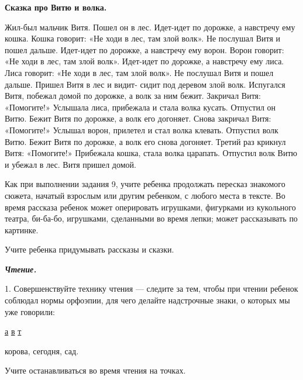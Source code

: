 \documentclass[a5paper]{book}
\renewcommand{\emph}[1]{\textit{#1}}
\begin{document}
\textbf{Сказка про Витю и волка.}

Жил-был мальчик Витя. Пошел он в лес. Идет-идет по дорожке, а навстречу
ему кошка. Кошка говорит: «Не ходи в лес, там злой волк». Не послушал
Витя и пошел дальше. Идет-идет по дорожке, а навстречу ему ворон. Ворон
говорит: «Не ходи в лес, там злой волк». Идет-идет по дорожке, а
навстречу ему лиса. Лиса говорит: «Не ходи в лес, там злой волк». Не
послушал Витя и пошел дальше. Пришел Витя в лес и видит- сидит под
деревом злой волк. Испугался Витя, побежал домой по дорожке, а волк за
ним бежит. Закричал Витя: «Помогите!» Услышала лиса, прибежала и стала
волка кусать. Отпустил он Витю. Бежит Витя по дорожке, а волк его
догоняет. Снова закричал Витя: «Помогите!» Услышал ворон, прилетел и
стал волка клевать. Отпустил волк Витю. Бежит Витя по дорожке, а волк
его снова догоняет. Третий раз крикнул Витя: «Помогите!» Прибежала
кошка, стала волка царапать. Отпустил волк Витю и убежал в лес. Витя
пришел домой.

Как при выполнении задания 9, учите ребенка продолжать пересказ
знакомого сюжета, начатый взрослым или другим ребенком, с любого места в
тексте. Во время рассказа ребенок может оперировать игрушками, фигурками
из кукольного театра, би-ба-бо, игрушками, сделанными во время лепки;
может рассказывать по картинке.

Учите ребенка придумывать рассказы и сказки.

\emph{\textbf{Чтение.}}

1. Совершенствуйте технику чтения --- следите за тем, чтобы при чтении
ребенок соблюдал нормы орфоэпии, для чего делайте надстрочные знаки, о
которых мы уже говорили:

\uline{а} \uline{в} \uline{т}

корова, сегодня, сад.

Учите останавливаться во время чтения на точках.
\end{document}
